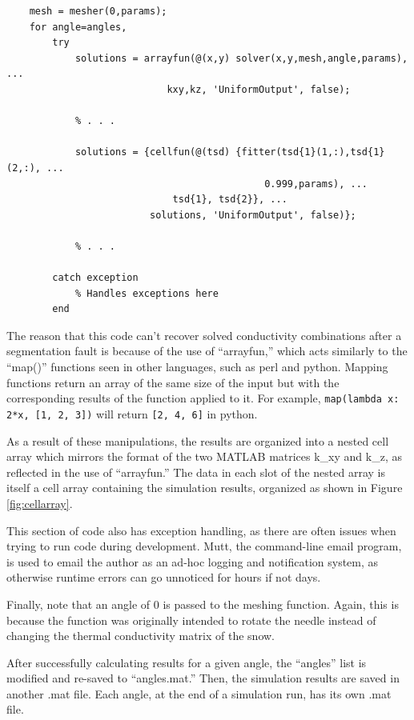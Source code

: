 \small
\begin{verbatim}
    mesh = mesher(0,params);
    for angle=angles,
        try
            solutions = arrayfun(@(x,y) solver(x,y,mesh,angle,params), ...
                            kxy,kz, 'UniformOutput', false);

            % . . .

            solutions = {cellfun(@(tsd) {fitter(tsd{1}(1,:),tsd{1}(2,:), ...
                                             0.999,params), ...
                             tsd{1}, tsd{2}}, ...
                         solutions, 'UniformOutput', false)};

            % . . .

        catch exception
            % Handles exceptions here
        end

\end{verbatim}
\normalsize

The reason that this code can't recover solved conductivity combinations
after a segmentation fault is because of the use of ``arrayfun,'' which acts 
similarly to the ``map()'' functions seen in other languages, such as perl and
python. Mapping functions return an array of the same size of the input but with the
corresponding results of the function applied to it. For example,
\texttt{map(lambda x: 2*x, [1, 2, 3])} will return \texttt{[2, 4, 6]} in python.

As a result of these manipulations, the results are organized into a nested
cell array which mirrors the format of the two MATLAB matrices k\_xy and k\_z,
as reflected in the use of ``arrayfun.'' The data in each slot of the
nested array is itself a cell array containing the simulation results, organized as shown
in Figure \ref{fig:cellarray}.

This section of code also has exception handling, as there are often issues when
trying to run code during development. Mutt, the command-line email program, is
used to email the author as an ad-hoc logging and notification system, as
otherwise runtime errors can go unnoticed for hours if not days.

Finally, note that an angle of \(0\) is passed to the meshing function. Again,
this is because the function was originally intended to rotate the needle
instead of changing the thermal conductivity matrix of the snow.

After successfully calculating results for a given angle, the ``angles'' list
is modified and re-saved to ``angles.mat.'' Then, the simulation results are
saved in another .mat file. Each angle, at the end of a simulation run, has its own .mat file. 

